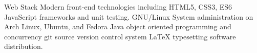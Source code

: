

\begin{cvskills}


  \cvskill
    {Web Stack} %
    {Modern front-end technologies including HTML5, CSS3, ES6 JavaScript frameworks and unit testing.}
  \cvskill
    {GNU/Linux} %
    {System administration on Arch Linux, Ubuntu, and Fedora} %
  \cvskill
    {Java} %
    {object oriented programming and concurrency}
  \cvskill
    {git} %
    {source version control system}
  \cvskill
    {LaTeX}
    {typesetting software distribution.}

\end{cvskills}
